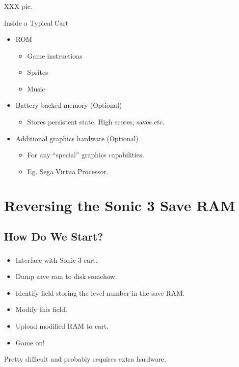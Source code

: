 \documentclass{beamer}
\begin{document}
\begin{frame}[fragile]
\frametitle{\insertsubsection}

XXX pic.

\begin{block}{Inside a Typical Cart}
\begin{itemize}
\item ROM
\begin{itemize}
\item Game instructions
\item Sprites
\item Music
\end{itemize}

\item Battery backed memory (Optional)
\begin{itemize}
\item Stores persistent state. High scores, saves etc.
\end{itemize}

\item Additional graphics hardware (Optional)
\begin{itemize}
\item For any ``special'' graphics capabilities.
\item Eg. Sega Virtua Processor.
\end{itemize}
\end{itemize}
\end{block}

\end{frame}


\section{Reversing the Sonic 3 Save RAM}

\subsection{How Do We Start?}

\begin{frame}[fragile]
\frametitle{\insertsubsection}

\begin{itemize}
\item Interface with Sonic 3 cart.
\item Dump save ram to disk somehow.
\item Identify field storing the level number in the save RAM.
\item Modify this field.
\item Upload modified RAM to cart.
\item Game on!
\end{itemize}

\pause
\vfill

Pretty difficult and probably requires extra hardware.

\end{frame}
\end{document}
